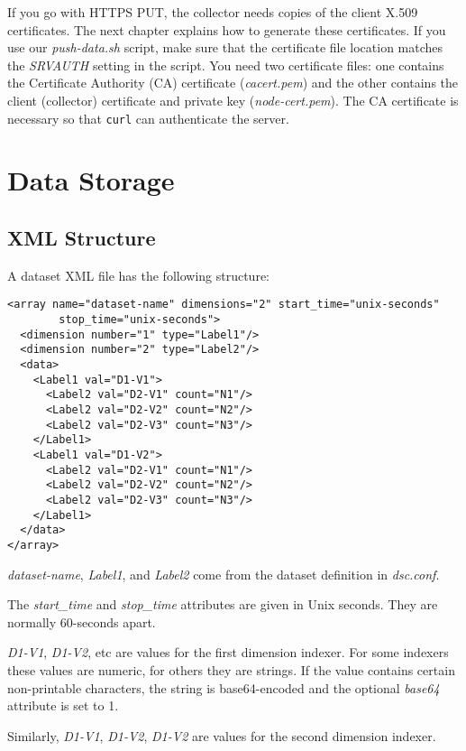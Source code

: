 \documentclass{report}
\begin{document}
If you go with HTTPS PUT, the collector needs copies of the client
X.509 certificates.  The next chapter explains how to generate these
certificates.  If you use our {\em push-data.sh\/} script, make
sure that the certificate file location matches the {\em SRVAUTH\/}
setting in the script.  You need two certificate files: one contains
the Certificate Authority (CA) certificate ({\em cacert.pem\/}) and the
other contains the client (collector) certificate and private key
({\em node-cert.pem\/}).  The CA certificate is
necessary so that {\tt curl\/} can authenticate the server.

\chapter{Data Storage}

\section{XML Structure}

A dataset XML file has the following structure:

\begin{verbatim}
<array name="dataset-name" dimensions="2" start_time="unix-seconds"
        stop_time="unix-seconds">
  <dimension number="1" type="Label1"/>
  <dimension number="2" type="Label2"/>
  <data>
    <Label1 val="D1-V1">
      <Label2 val="D2-V1" count="N1"/>
      <Label2 val="D2-V2" count="N2"/>
      <Label2 val="D2-V3" count="N3"/>
    </Label1>
    <Label1 val="D1-V2">
      <Label2 val="D2-V1" count="N1"/>
      <Label2 val="D2-V2" count="N2"/>
      <Label2 val="D2-V3" count="N3"/>
    </Label1>
  </data>
</array>
\end{verbatim}

\noindent
{\em dataset-name\/},
{\em Label1\/}, and
{\em Label2\/} come from the dataset definition in {\em dsc.conf\/}.

\noindent
The {\em start\_time\/} and {\em stop\_time\/} attributes
are given in Unix seconds.  They are normally 60-seconds apart.

\noindent
{\em D1-V1\/}, {\em D1-V2\/}, etc are values for the
first dimension indexer.  For some indexers these values are
numeric, for others they are strings.  If the value contains
certain non-printable characters, the string is base64-encoded
and the optional {\em base64\/} attribute is set to 1.

\noindent
Similarly, {\em D1-V1\/}, {\em D1-V2\/}, {\em D1-V2\/} are
values for the second dimension indexer.
\end{document}
